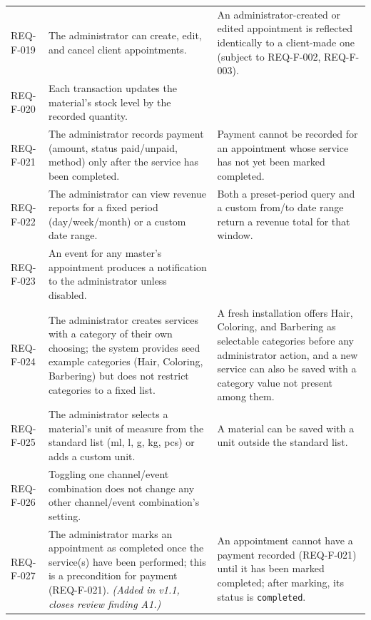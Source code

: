 \documentclass[11pt,a4paper]{article}
\begin{document}
\begin{longtable}{L{1.9cm}L{6.4cm}L{6.2cm}}
REQ-F-019 &
The administrator can create, edit, and cancel client appointments. &
An administrator-created or edited appointment is reflected identically
to a client-made one (subject to REQ-F-002, REQ-F-003). \\

REQ-F-020 &
Each transaction updates the material's stock level by the recorded
quantity. \\

REQ-F-021 &
The administrator records payment (amount, status paid/unpaid, method)
only after the service has been completed. &
Payment cannot be recorded for an appointment whose service has not yet
been marked completed.  \\

REQ-F-022 &
The administrator can view revenue reports for a fixed period
(day/week/month) or a custom date range. &
Both a preset-period query and a custom from/to date range return a
revenue total for that window. \\

REQ-F-023 &
An event for any master's appointment produces a notification to the
administrator unless disabled. \\

REQ-F-024 &
The administrator creates services with a category of their own choosing;
the system provides seed example categories (Hair, Coloring, Barbering)
but does not restrict categories to a fixed list. &
A fresh installation offers Hair, Coloring, and Barbering as selectable
categories before any administrator action, and a new service can also be
saved with a category value not present among them.  \\

REQ-F-025 &
The administrator selects a material's unit of measure from the standard
list (ml, l, g, kg, pcs) or adds a custom unit. &
A material can be saved with a unit outside the standard list. \\

REQ-F-026 &
Toggling one channel/event combination does not change any other
channel/event combination's setting. \\

REQ-F-027 &
The administrator marks an appointment as completed once the service(s)
have been performed; this is a precondition for payment (REQ-F-021).
\emph{(Added in v1.1, closes review finding A1.)} &
An appointment cannot have a payment recorded (REQ-F-021) until it has
been marked completed; after marking, its status is \texttt{completed}.  \\


\end{longtable}
\end{document}

